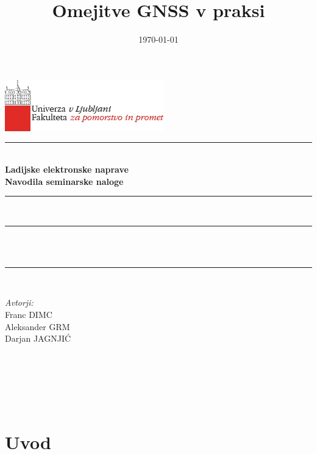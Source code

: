 \documentclass[11pt,a4]{article}
\title{Omejitve GNSS v praksi }
\date{\today}
\author{}
\makeatletter
\let\thetitle\@title
\let\thedate\@date
\makeatother
\begin{document}

\begin{titlepage}
	\centering
	\vspace*{-2cm}
    \includegraphics[scale = 0.75]{logo_FPP.png}\\[1.0 cm]
    
	\rule{\linewidth}{1 mm} \\[0.4 cm]
	{ \huge \bfseries Ladijske elektronske naprave} \\[0.5 cm]
	{ \Large \bfseries Navodila seminarske naloge}
	\rule{\linewidth}{1 mm} \\[1 cm]
	
	\rule{\linewidth}{0.5 mm} \\[0.4 cm]
	{ \large \bfseries \thetitle}\\[0.0 cm]
	\rule{\linewidth}{0.5 mm} \\[2 cm]
	
	\begin{minipage}{0.4\textwidth}
		\begin{flushleft} \large
			\emph{Avtorji:}\\[0.2 cm]
			Franc DIMC\\
			Aleksander GRM\\
			Darjan JAGNJIĆ
			\end{flushleft}
			\end{minipage}~
			\begin{minipage}{0.4\textwidth}
			\begin{flushright}
			\end{flushright}
	\end{minipage}\\[2 cm]
	
	\vfill
	
	{\large \thedate}\\[2 cm]
 
	
	
\end{titlepage}


\tableofcontents
\pagebreak


\section{Uvod}


\newpage


\end{document}
